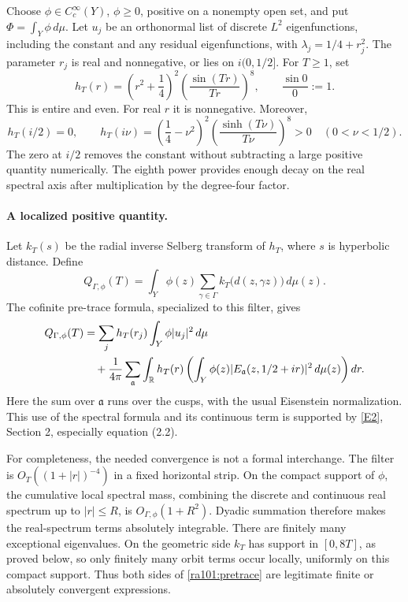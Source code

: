 \documentclass[11pt]{article}
\newcommand{\R}{\mathbb{R}}
\newcommand{\eref}[2]{\hyperlink{extra:#1:#2}{[E#2]}}
\begin{document}
Choose $\phi\in C_c^\infty(Y)$, $\phi\ge0$, positive on a nonempty open set,
and put $\Phi=\int_Y\phi\,d\mu$. Let $u_j$ be an orthonormal list of discrete
$L^2$ eigenfunctions, including the constant and any residual eigenfunctions,
with $\lambda_j=1/4+r_j^2$. The parameter $r_j$ is real and nonnegative,
or lies on $i(0,1/2]$. For $T\ge1$, set
\begin{equation}\label{ra101:filter}
 h_T(r)=\left(r^2+\frac14\right)^2
          \left(\frac{\sin(Tr)}{Tr}\right)^8,
 \qquad \frac{\sin 0}{0}:=1.
\end{equation}
This is entire and even. For real $r$ it is nonnegative. Moreover,
\begin{equation}\label{ra101:exception}
 h_T(i/2)=0,\qquad
 h_T(i\nu)=\left(\frac14-\nu^2\right)^2
             \left(\frac{\sinh(T\nu)}{T\nu}\right)^8>0
       \quad(0<\nu<1/2).
\end{equation}
The zero at $i/2$ removes the constant without subtracting a large positive
quantity numerically. The eighth power provides enough decay on the real
spectral axis after multiplication by the degree-four factor.

\paragraph{A localized positive quantity.}
Let $k_T(s)$ be the radial inverse Selberg transform of $h_T$, where $s$
is hyperbolic distance. Define
\begin{equation}\label{ra101:quantity}
 Q_{\Gamma,\phi}(T)=
 \int_Y\phi(z)\sum_{\gamma\in\Gamma}
                k_T\bigl(d(z,\gamma z)\bigr)\,d\mu(z).
\end{equation}
The cofinite pre-trace formula, specialized to this filter, gives
\begin{align}\label{ra101:pretrace}
 Q_{\Gamma,\phi}(T)
 &=\sum_j h_T(r_j)\int_Y\phi|u_j|^2\,d\mu \\
 &\quad+\frac1{4\pi}\sum_{\mathfrak a}
   \int_{\R}h_T(r)
      \left(\int_Y\phi(z)
        |E_{\mathfrak a}(z,1/2+ir)|^2\,d\mu(z)\right)dr.\notag
\end{align}
Here the sum over $\mathfrak a$ runs over the cusps, with the usual Eisenstein
normalization. This use of the spectral formula and its continuous term is
supported by \eref{101}{2}, Section 2, especially equation (2.2).

For completeness, the needed convergence is not a formal interchange.
The filter is $O_T((1+|r|)^{-4})$ in a fixed horizontal strip. On the compact
support of $\phi$, the cumulative local spectral mass, combining the discrete
and continuous real spectrum up to $|r|\le R$, is $O_{\Gamma,\phi}(1+R^2)$.
Dyadic summation therefore makes the real-spectrum terms absolutely
integrable. There are finitely many exceptional eigenvalues. On the geometric
side $k_T$ has support in $[0,8T]$, as proved below, so only finitely many
orbit terms occur locally, uniformly on this compact support. Thus both sides
of \eqref{ra101:pretrace} are legitimate finite or absolutely convergent
expressions.
\end{document}
